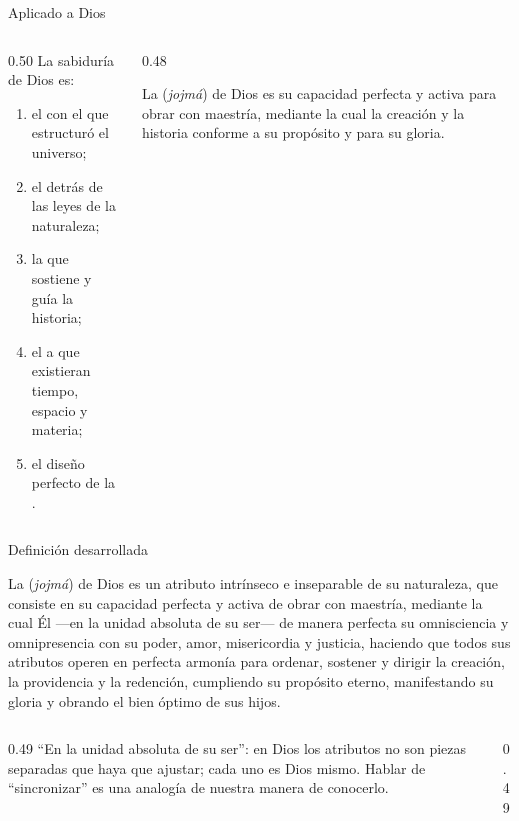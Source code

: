 \begin{frame}{Aplicado a Dios}
\begin{columns}[c,onlytextwidth]
\begin{column}{0.50\textwidth}
\small\RaggedRight La sabiduría de Dios es:
\begin{enumerate}
\item el  con el que estructuró el universo;
\item el  detrás de las leyes de la naturaleza;
\item la  que sostiene y guía la historia;
\item el  a que existieran tiempo, espacio y materia;
\item el diseño perfecto de la .
\end{enumerate}
\end{column}
\begin{column}{0.48\textwidth}
\begin{tcolorbox}[colback=papiro,colframe=azul,boxrule=1pt,arc=3pt]
\small La  (\emph{jojmá}) de Dios es su capacidad perfecta y activa para obrar con maestría, mediante la cual  la creación y la historia conforme a su propósito y para su gloria.
\end{tcolorbox}
\end{column}
\end{columns}
\end{frame}

\begin{frame}{Definición desarrollada}
\begin{tcolorbox}[colback=papiro,colframe=azul,boxrule=1pt,arc=3pt]
\small La  (\emph{jojmá}) de Dios es un atributo intrínseco e inseparable de su naturaleza, que consiste en su capacidad perfecta y activa de obrar con maestría, mediante la cual Él ---en la unidad absoluta de su ser---  de manera perfecta su omnisciencia y omnipresencia con su poder, amor, misericordia y justicia, haciendo que todos sus atributos operen en perfecta armonía para ordenar, sostener y dirigir la creación, la providencia y la redención, cumpliendo su propósito eterno, manifestando su gloria y obrando el bien óptimo de sus hijos.
\end{tcolorbox}
\begin{columns}[t,onlytextwidth]
\begin{column}{0.49\textwidth}\scriptsize
``En la unidad absoluta de su ser'': en Dios los atributos no son piezas separadas que haya que ajustar; cada uno es Dios mismo. Hablar de ``sincronizar'' es una analogía de nuestra manera de conocerlo.
\end{column}
\begin{column}{0.49\textwidth}
\end{column}
\end{columns}
\end{frame}

